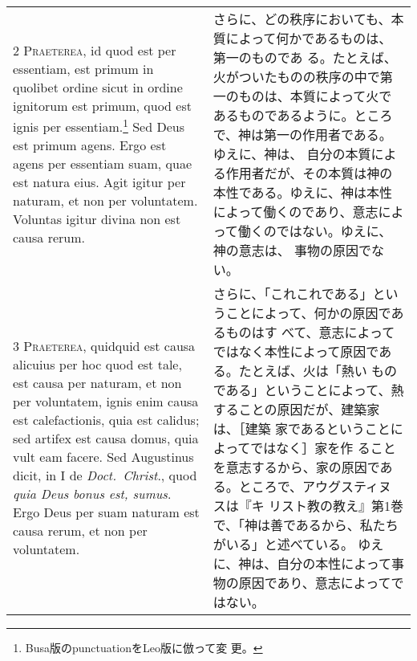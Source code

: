 \documentclass[10pt]{jsarticle} %
\begin{document}
\begin{longtable}{p{21em}p{21em}}
{\scshape 2 Praeterea}, id quod est per essentiam, est
 primum in quolibet ordine sicut in ordine ignitorum est primum, quod
 est ignis per essentiam.\footnote{Busa版のpunctuationをLeo版に倣って変
 更。} Sed Deus est primum agens. Ergo est agens per
 essentiam suam, quae est natura eius. Agit igitur per naturam, et non
 per voluntatem. Voluntas igitur divina non est causa rerum.

 
&

さらに、どの秩序においても、本質によって何かであるものは、第一のものであ
 る。たとえば、火がついたものの秩序の中で第一のものは、本質によって火で
 あるものであるように。ところで、神は第一の作用者である。ゆえに、神は、
 自分の本質による作用者だが、その本質は神の本性である。ゆえに、神は本性
 によって働くのであり、意志によって働くのではない。ゆえに、神の意志は、
 事物の原因でない。
 
\\



{\scshape 3 Praeterea}, quidquid est causa alicuius per
 hoc quod est tale, est causa per naturam, et non per voluntatem, ignis
 enim causa est calefactionis, quia est calidus; sed artifex est causa
 domus, quia vult eam facere. Sed Augustinus dicit, in I de
 {\itshape Doct.~Christ}., quod {\itshape quia Deus bonus est, sumus}. Ergo Deus per suam
 naturam est causa rerum, et non per voluntatem.

 
&

 さらに、「これこれである」ということによって、何かの原因であるものはす
 べて、意志によってではなく本性によって原因である。たとえば、火は「熱い
 ものである」ということによって、熱することの原因だが、建築家は、［建築
 家であるということによってではなく］家を作
 ることを意志するから、家の原因である。ところで、アウグスティヌスは『キ
 リスト教の教え』第1巻で、「神は善であるから、私たちがいる」と述べている。
 ゆえに、神は、自分の本性によって事物の原因であり、意志によってではない。


\end{longtable}
\end{document}

